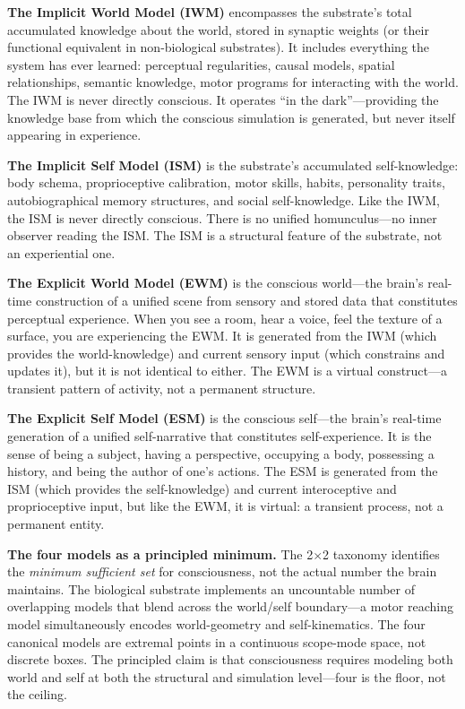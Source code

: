 \documentclass[12pt]{article}
\begin{document}
\textbf{The Implicit World Model (IWM)} encompasses the substrate's total accumulated knowledge about the world, stored in synaptic weights (or their functional equivalent in non-biological substrates). It includes everything the system has ever learned: perceptual regularities, causal models, spatial relationships, semantic knowledge, motor programs for interacting with the world. The IWM is never directly conscious. It operates ``in the dark''---\hspace{0pt}providing the knowledge base from which the conscious simulation is generated, but never itself appearing in experience.

\textbf{The Implicit Self Model (ISM)} is the substrate's accumulated self-knowledge: body schema, proprioceptive calibration, motor skills, habits, personality traits, autobiographical memory structures, and social self-knowledge. Like the IWM, the ISM is never directly conscious. There is no unified homunculus---\hspace{0pt}no inner observer reading the ISM. The ISM is a structural feature of the substrate, not an experiential one.

\textbf{The Explicit World Model (EWM)} is the conscious world---\hspace{0pt}the brain's real-time construction of a unified scene from sensory and stored data that constitutes perceptual experience. When you see a room, hear a voice, feel the texture of a surface, you are experiencing the EWM. It is generated from the IWM (which provides the world-knowledge) and current sensory input (which constrains and updates it), but it is not identical to either. The EWM is a virtual construct---\hspace{0pt}a transient pattern of activity, not a permanent structure.

\textbf{The Explicit Self Model (ESM)} is the conscious self---\hspace{0pt}the brain's real-time generation of a unified self-narrative that constitutes self-experience. It is the sense of being a subject, having a perspective, occupying a body, possessing a history, and being the author of one's actions. The ESM is generated from the ISM (which provides the self-knowledge) and current interoceptive and proprioceptive input, but like the EWM, it is virtual: a transient process, not a permanent entity.

\textbf{The four models as a principled minimum.} The 2$\times$2 taxonomy identifies the \emph{minimum sufficient set} for consciousness, not the actual number the brain maintains. The biological substrate implements an uncountable number of overlapping models that blend across the world/self boundary---\hspace{0pt}a motor reaching model simultaneously encodes world-geometry and self-kinematics. The four canonical models are extremal points in a continuous scope-mode space, not discrete boxes. The principled claim is that consciousness requires modeling both world and self at both the structural and simulation level---\hspace{0pt}four is the floor, not the ceiling.
\end{document}
